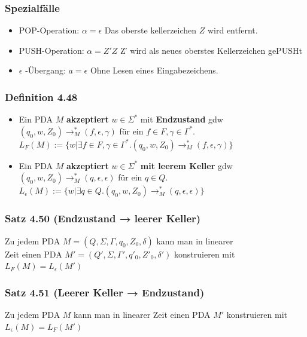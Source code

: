 \documentclass[11pt]{article}
\begin{document}
\subsubsection{Spezialfälle}
\label{sec:org6ac225d}
\begin{itemize}
\item POP-Operation: \(\alpha = \epsilon\)
Das oberste kellerzeichen \(Z\) wird entfernt.
\item PUSH-Operation: \(\alpha = Z'Z\)
Z′ wird als neues oberstes Kellerzeichen gePUSHt
\item \(\epsilon\) -Übergang: \(a = \epsilon\)
Ohne Lesen eines Eingabezeichens.
\end{itemize}
\subsubsection{Definition 4.48}
\label{sec:org5f1bfdf}
\begin{itemize}
\item Ein PDA \(M\) \textbf{akzeptiert} \(w \in \Sigma^*\) mit \textbf{Endzustand} gdw \\
\((q_0, w, Z_0) \rightarrow^*_M (f, \epsilon, \gamma)\) für ein \(f \in F, \gamma \in \Gamma^*\). \\

\(L_F(M) := \{w | \exists f \in F, \gamma \in \Gamma^*. (q_0, w, Z_0) \rightarrow^*_M (f,\epsilon,\gamma)\}\)

\item Ein PDA \(M\) \textbf{akzeptiert} \(w \in \Sigma^*\) \textbf{mit leerem Keller} gdw
\((q_0, w, Z_0) \rightarrow^*_M (q, \epsilon, \epsilon)\) für ein \(q \in Q\). \\

\(L_\epsilon(M) := \{w | \exists q \in Q. (q_0, w, Z_0) \rightarrow^*_M (q,\epsilon,\epsilon)\}\)
\end{itemize}

\subsubsection{Satz 4.50 (Endzustand → leerer Keller)}
\label{sec:orgf7ae9a4}
Zu jedem PDA \(M = (Q, \Sigma, \Gamma, q_0, Z_0, \delta)\) kann man in linearer \\
Zeit einen PDA \(M' = (Q', \Sigma, \Gamma', q'_0, Z'_0, \delta′)\) konstruieren mit \\
\(L_F(M) = L_\epsilon(M')\)

\subsubsection{Satz 4.51 (Leerer Keller → Endzustand)}
\label{sec:orgb5196ea}
Zu jedem PDA \(M\) kann man in linearer Zeit einen PDA \(M'\) konstruieren mit \\
\(L_\epsilon(M) = L_F(M')\)
\end{document}
